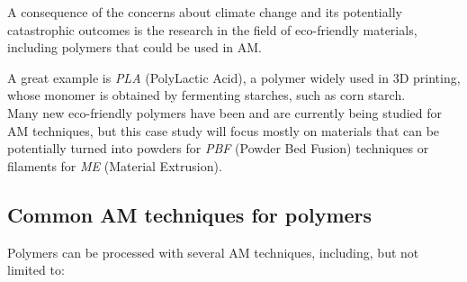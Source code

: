 \documentclass{article}
\begin{document}
    A consequence of the concerns about climate change and its potentially catastrophic outcomes is the research in the field of eco-friendly materials, including polymers 
    that could be used in AM. 
    
    A great example is \textit{PLA} (PolyLactic Acid), a polymer widely used in 3D printing, whose monomer is obtained by fermenting starches, such as corn starch. \\ 

    Many new eco-friendly polymers have been and are currently being studied for AM techniques, but this case study will focus mostly on materials that can be potentially turned 
    into powders for \textit{PBF} (Powder Bed Fusion) techniques or filaments for \textit{ME} (Material Extrusion). 
    
    \subsection{Common AM techniques for polymers\label{AM_techniques_summary}}
    
    Polymers can be processed with several AM techniques, including, but not limited to: 
\end{document}

